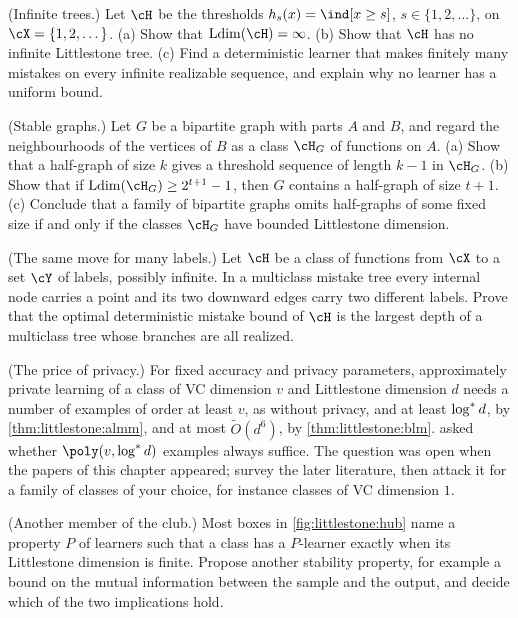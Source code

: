\begin{refsection}
\begin{exercises}
\item \transfer (Infinite trees.) Let $\cH$ be the thresholds $h_s(x)=\ind[x\ge s]$, $s\in\{1,2,\dots\}$, on $\cX=\{1,2,\dots\}$. (a) Show that $\littlestoneLdim(\cH)=\infty$. (b) Show that $\cH$ has no infinite Littlestone tree. (c) Find a deterministic learner that makes finitely many mistakes on every infinite realizable sequence, and explain why no learner has a uniform bound. \label{ex:littlestone:naturals}
\item \transfer (Stable graphs.) Let $G$ be a bipartite graph with parts $A$ and $B$, and regard the neighbourhoods of the vertices of $B$ as a class $\cH_G$ of functions on $A$. (a) Show that a half-graph of size $k$ gives a threshold sequence of length $k-1$ in $\cH_G$. (b) Show that if $\littlestoneLdim(\cH_G)\ge2^{t+1}-1$, then $G$ contains a half-graph of size $t+1$. (c) Conclude that a family of bipartite graphs omits half-graphs of some fixed size if and only if the classes $\cH_G$ have bounded Littlestone dimension. \label{ex:littlestone:halfgraph}
\item \transfer\hard (The same move for many labels.) Let $\cH$ be a class of functions from $\cX$ to a set $\cY$ of labels, possibly infinite. In a multiclass mistake tree every internal node carries a point and its two downward edges carry two different labels. Prove that the optimal deterministic mistake bound of $\cH$ is the largest depth of a multiclass tree whose branches are all realized. 
\item \research (The price of privacy.) For fixed accuracy and privacy parameters, approximately private learning of a class of VC dimension $v$ and Littlestone dimension $d$ needs a number of examples of order at least $v$, as without privacy, and at least $\log^{*} d$, by \cref{thm:littlestone:almm}, and at most $\tilde O(d^6)$, by \cref{thm:littlestone:blm}. \Textcite{BunLivniMoran2020} asked whether $\poly(v,\littlestoneLogstar d)$ examples always suffice. The question was open when the papers of this chapter appeared; survey the later literature, then attack it for a family of classes of your choice, for instance classes of VC dimension $1$.\label{ex:littlestone:research-sample}
\item \research\harder (Another member of the club.) Most boxes in \cref{fig:littlestone:hub} name a property $P$ of learners such that a class has a $P$-learner exactly when its Littlestone dimension is finite. Propose another stability property, for example a bound on the mutual information between the sample and the output, and decide which of the two implications hold. 
\end{exercises}


\end{refsection}
